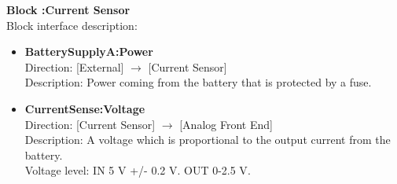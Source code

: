 \textbf{Block :Current Sensor}\\
Block interface description:
\begin{itemize}
	\item \textbf{BatterySupplyA:Power}\\
	Direction: [External] $\rightarrow$ [Current Sensor]\\
	Description: Power coming from the battery that is protected by a fuse.
	\item \textbf{CurrentSense:Voltage}\\
	Direction: [Current Sensor] $\rightarrow$ [Analog Front End]\\
	Description: A voltage which is proportional to the output current from the battery.\\
	Voltage level: IN 5 V +/- 0.2 V. OUT 0-2.5 V\cite{BMSDocumentation}. 
\end{itemize}

